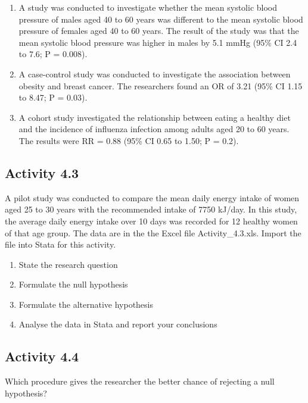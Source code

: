 \documentclass[
]{memoir}
\providecommand{\tightlist}{%
  \setlength{\itemsep}{0pt}\setlength{\parskip}{0pt}}
\begin{document}
\begin{enumerate}
\def\labelenumi{\alph{enumi})}
\tightlist
\item
  A study was conducted to investigate whether the mean systolic blood pressure of males aged 40 to 60 years was different to the mean systolic blood pressure of females aged 40 to 60 years. The result of the study was that the mean systolic blood pressure was higher in males by 5.1 mmHg (95\% CI 2.4 to 7.6; P = 0.008).
\item
  A case-control study was conducted to investigate the association between obesity and breast cancer. The researchers found an OR of 3.21 (95\% CI 1.15 to 8.47; P = 0.03).
\item
  A cohort study investigated the relationship between eating a healthy diet and the incidence of influenza infection among adults aged 20 to 60 years. The results were RR = 0.88 (95\% CI 0.65 to 1.50; P = 0.2).
\end{enumerate}

\hypertarget{activity-4.3}{%
\subsection{Activity 4.3}\label{activity-4.3}}

A pilot study was conducted to compare the mean daily energy intake of women aged 25 to 30 years with the recommended intake of 7750 kJ/day. In this study, the average daily energy intake over 10 days was recorded for 12 healthy women of that age group. The data are in the the Excel file Activity\_4.3.xls. Import the file into Stata for this activity.

\begin{enumerate}
\def\labelenumi{\alph{enumi})}
\tightlist
\item
  State the research question
\item
  Formulate the null hypothesis
\item
  Formulate the alternative hypothesis
\item
  Analyse the data in Stata and report your conclusions
\end{enumerate}

\hypertarget{activity-4.4}{%
\subsection{Activity 4.4}\label{activity-4.4}}

Which procedure gives the researcher the better chance of rejecting a null hypothesis?
\end{document}
